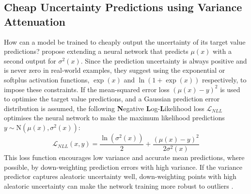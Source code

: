 \subsection{Cheap Uncertainty Predictions using Variance Attenuation} \label{txt:variance-attenuation}

How can a model be trained to cheaply output the uncertainty of its target value predictions? \textcite{nll-loss-1994} propose extending a neural network that predicts $\mu(x)$ with a second output for $\sigma^2(x)$. Since the prediction uncertainty is always positive and is never zero in real-world examples, they suggest using the exponential \cite{nll-loss-1994} or softplus \cite{reliable-variance-2019} activation functions, $\exp(x)$ and $\ln(1 + \exp(x))$ respectively, to impose these constraints. If the mean-squared error loss $(\mu(x) - y)^2$ is used to optimise the target value predictions, and a Gaussian prediction error distribution is assumed, the following \textbf{N}egative \textbf{L}og-\textbf{L}ikelihood loss $\mathcal{L}_{NLL}$ optimises the neural network to make the maximum likelihood predictions $y \sim \text{N}(\mu(x), \sigma^2(x))$:
\begin{equation} \label{eq:nll-loss}
    \mathcal{L}_{NLL}(x, y) = \frac{\ln(\sigma^2(x))}{2} + \frac{(\mu(x) - y)^2}{2 \sigma^2(x)}
\end{equation}
This loss function encourages low variance and accurate mean predictions, where possible, by down-weighting prediction errors with high variance. If the variance predictor captures aleatoric uncertainty well, down-weighting points with high aleatoric uncertainty can make the network training more robust to outliers \cite{bayesian-deep-uncertainty-2017}.

